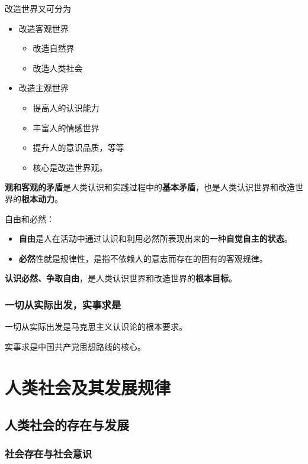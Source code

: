 \documentclass[12pt, a4paper, oneside]{ctexart}
\begin{document}
改造世界又可分为
\begin{itemize}
  \item 改造客观世界
  \begin{itemize}
    \item 改造自然界
    \item 改造人类社会
  \end{itemize}
  \item 改造主观世界
  \begin{itemize}
    \item 提高人的认识能力
    \item 丰富人的情感世界
    \item 提升人的意识品质，等等
    \item 核心是改造世界观。
  \end{itemize}
\end{itemize}

\textbf{观和客观的矛盾}是人类认识和实践过程中的\textbf{基本矛盾}，也是人类认识世界和改造世界的\textbf{根本动力}。

自由和必然：
\begin{itemize}
  \item {\bf 自由}是人在活动中通过认识和利用必然所表现出来的一种\textbf{自觉自主的状态}。
  \item {\bf 必然}性就是规律性，是指不依赖人的意志而存在的固有的客观规律。
\end{itemize}

\textbf{认识必然、争取自由}，是人类认识世界和改造世界的\textbf{根本目标}。

\subsubsection{一切从实际出发，实事求是}

一切从实际出发是马克思主义认识论的根本要求。

实事求是中国共产党思想路线的核心。

\section{人类社会及其发展规律}

\subsection{人类社会的存在与发展}

\subsubsection{社会存在与社会意识}
\end{document}
